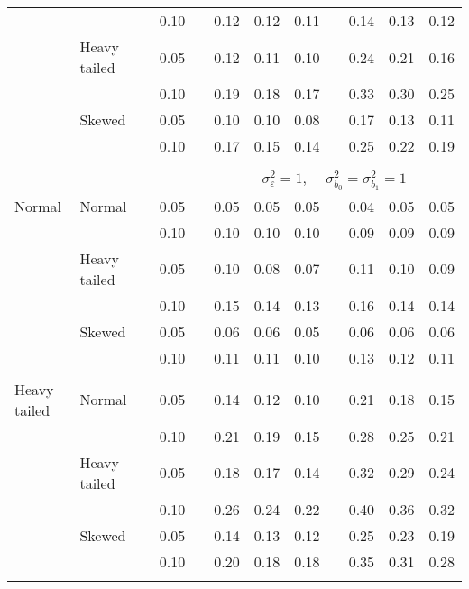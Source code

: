 \begin{table}[ht]
\begin{scriptsize}
\begin{tabular}{ll p{.1cm} c p{.1cm} rrr p{.1cm} rrr}
             &              && 0.10 &&  0.12 & 0.12 & 0.11 && 0.14 & 0.13 & 0.12 \\ 
             & Heavy tailed && 0.05 &&  0.12 & 0.11 & 0.10 && 0.24 & 0.21 & 0.16 \\ 
             &              && 0.10 &&  0.19 & 0.18 & 0.17 && 0.33 & 0.30 & 0.25 \\ 
             & Skewed       && 0.05 &&  0.10 & 0.10 & 0.08 && 0.17 & 0.13 & 0.11 \\ 
             &              && 0.10 &&  0.17 & 0.15 & 0.14 && 0.25 & 0.22 & 0.19 \\ 

&&&&&&&&&&&\\
& && && \multicolumn{7}{c}{$\sigma_{\varepsilon}^2 = 1$, \ \ $\sigma_{b_0}^2 = \sigma_{b_1}^2 = 1$} \\ \cline{6-12}
\rowcolor{gray!20}Normal       & Normal       && 0.05 &&  0.05 & 0.05 & 0.05 && 0.04 & 0.05 & 0.05 \\ 
\rowcolor{gray!20}             &              && 0.10 &&  0.10 & 0.10 & 0.10 && 0.09 & 0.09 & 0.09 \\ 
\rowcolor{gray!20}             & Heavy tailed && 0.05 &&  0.10 & 0.08 & 0.07 && 0.11 & 0.10 & 0.09 \\ 
\rowcolor{gray!20}             &              && 0.10 &&  0.15 & 0.14 & 0.13 && 0.16 & 0.14 & 0.14 \\ 
\rowcolor{gray!20}             & Skewed       && 0.05 &&  0.06 & 0.06 & 0.05 && 0.06 & 0.06 & 0.06 \\ 
\rowcolor{gray!20}             &              && 0.10 &&  0.11 & 0.11 & 0.10 && 0.13 & 0.12 & 0.11 \\ 
             &&&&&&&&&&&\\
Heavy tailed & Normal       && 0.05 &&  0.14 & 0.12 & 0.10 && 0.21 & 0.18 & 0.15 \\ 
             &              && 0.10 &&  0.21 & 0.19 & 0.15 && 0.28 & 0.25 & 0.21 \\ 
             & Heavy tailed && 0.05 &&  0.18 & 0.17 & 0.14 && 0.32 & 0.29 & 0.24 \\ 
             &              && 0.10 &&  0.26 & 0.24 & 0.22 && 0.40 & 0.36 & 0.32 \\ 
             & Skewed       && 0.05 &&  0.14 & 0.13 & 0.12 && 0.25 & 0.23 & 0.19 \\ 
             &              && 0.10 &&  0.20 & 0.18 & 0.18 && 0.35 & 0.31 & 0.28 \\ 
             &&&&&&&&&&&\\

\end{tabular}
\end{scriptsize}
\end{table}

